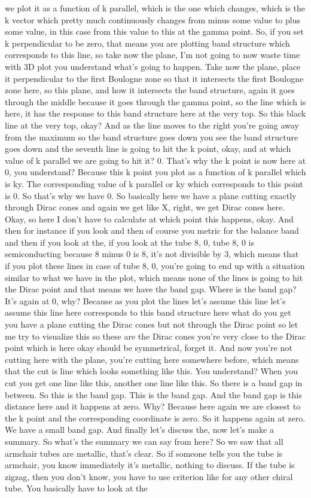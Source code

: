 we plot it as a function of k parallel, which is the one which changes, which is the k vector which pretty much continuously changes from minus some value to plus some value, in this case from this value to this at the gamma point. So, if you set k perpendicular to be zero, that means you are plotting band structure which corresponds to this line, so take now the plane, I'm not going to now waste time with 3D plot you understand what's going to happen. Take now the plane, place it perpendicular to the first Boulogne zone so that it intersects the first Boulogne zone here, so this plane, and how it intersects the band structure, again it goes through the middle because it goes through the gamma point, so the line which is here, it has the response to this band structure here at the very top. So this black line at the very top, okay? And as the line moves to the right you're going away from the maximum so the band structure goes down you see the band structure goes down and the seventh line is going to hit the k point, okay, and at which value of k parallel we are going to hit it? 0. That's why the k point is now here at 0, you understand? Because this k point you plot as a function of k parallel which is ky. The corresponding value of k parallel or ky which corresponds to this point is 0. So that's why we have 0. So basically here we have a plane cutting exactly through Dirac cones and again we get like X, right, we get Dirac cones here. Okay, so here I don't have to calculate at which point this happens, okay. And then for instance if you look and then of course you metric for the balance band and then if you look at the, if you look at the tube 8, 0, tube 8, 0 is semiconducting because 8 minus 0 is 8, it's not divisible by 3, which means that if you plot these lines in case of tube 8, 0, you're going to end up with a situation similar to what we have in the plot, which means none of the lines is going to hit the Dirac point and that means we have the band gap. Where is the band gap? It's again at 0, why? Because as you plot the lines let's assume this line let's assume this line here corresponds to this band structure here what do you get you have a plane cutting the Dirac cones but not through the Dirac point so let me try to visualize this so these are the Dirac cones you're very close to the Dirac point which is here okay should be symmetrical, forget it. And now you're not cutting here with the plane, you're cutting here somewhere before, which means that the cut is line which looks something like this. You understand? When you cut you get one line like this, another one line like this. So there is a band gap in between. So this is the band gap. This is the band gap. And the band gap is this distance here and it happens at zero. Why? Because here again we are closest to the k point and the corresponding coordinate is zero. So it happens again at zero. We have a small band gap. And finally let's discuss the, now let's make a summary. So what's the summary we can say from here? So we saw that all armchair tubes are metallic, that's clear. So if someone tells you the tube is armchair, you know immediately it's metallic, nothing to discuss. If the tube is zigzag, then you don't know, you have to use criterion like for any other chiral tube. You basically have to look at the 